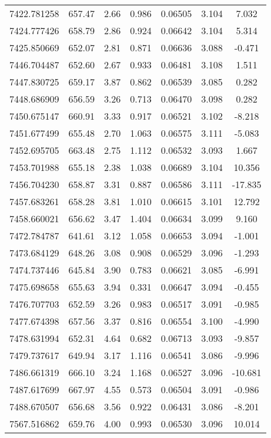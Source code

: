 \begin{table}
\begin{tabular}{ccccccc}
7422.781258 & 657.47 & 2.66 & 0.986 & 0.06505 & 3.104 & 7.032 \\
7424.777426 & 658.79 & 2.86 & 0.924 & 0.06642 & 3.104 & 5.314 \\
7425.850669 & 652.07 & 2.81 & 0.871 & 0.06636 & 3.088 & -0.471 \\
7446.704487 & 652.60 & 2.67 & 0.933 & 0.06481 & 3.108 & 1.511 \\
7447.830725 & 659.17 & 3.87 & 0.862 & 0.06539 & 3.085 & 0.282 \\
7448.686909 & 656.59 & 3.26 & 0.713 & 0.06470 & 3.098 & 0.282 \\
7450.675147 & 660.91 & 3.33 & 0.917 & 0.06521 & 3.102 & -8.218 \\
7451.677499 & 655.48 & 2.70 & 1.063 & 0.06575 & 3.111 & -5.083 \\
7452.695705 & 663.48 & 2.75 & 1.112 & 0.06532 & 3.093 & 1.667 \\
7453.701988 & 655.18 & 2.38 & 1.038 & 0.06689 & 3.104 & 10.356 \\
7456.704230 & 658.87 & 3.31 & 0.887 & 0.06586 & 3.111 & -17.835 \\
7457.683261 & 658.28 & 3.81 & 1.010 & 0.06615 & 3.101 & 12.792 \\
7458.660021 & 656.62 & 3.47 & 1.404 & 0.06634 & 3.099 & 9.160 \\
7472.784787 & 641.61 & 3.12 & 1.058 & 0.06653 & 3.094 & -1.001 \\
7473.684129 & 648.26 & 3.08 & 0.908 & 0.06529 & 3.096 & -1.293 \\
7474.737446 & 645.84 & 3.90 & 0.783 & 0.06621 & 3.085 & -6.991 \\
7475.698658 & 655.63 & 3.94 & 0.331 & 0.06647 & 3.094 & -0.455 \\
7476.707703 & 652.59 & 3.26 & 0.983 & 0.06517 & 3.091 & -0.985 \\
7477.674398 & 657.56 & 3.37 & 0.816 & 0.06554 & 3.100 & -4.990 \\
7478.631994 & 652.31 & 4.64 & 0.682 & 0.06713 & 3.093 & -9.857 \\
7479.737617 & 649.94 & 3.17 & 1.116 & 0.06541 & 3.086 & -9.996 \\
7486.661319 & 666.10 & 3.24 & 1.168 & 0.06527 & 3.096 & -10.681 \\
7487.617699 & 667.97 & 4.55 & 0.573 & 0.06504 & 3.091 & -0.986 \\
7488.670507 & 656.68 & 3.56 & 0.922 & 0.06431 & 3.086 & -8.201 \\
7567.516862 & 659.76 & 4.00 & 0.993 & 0.06530 & 3.096 & 10.014 \\

\end{tabular}
\end{table}
